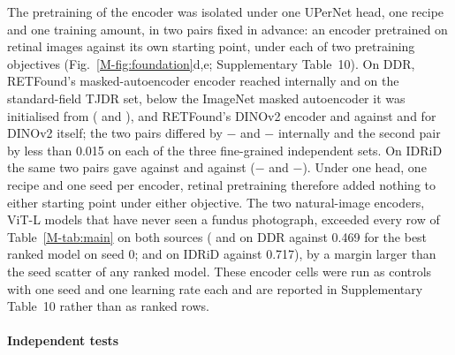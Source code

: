 The pretraining of the encoder was isolated under one UPerNet head, one recipe and one training amount, in two pairs fixed in advance: an encoder pretrained on retinal images against its own starting point, under each of two pretraining objectives (Fig.~\ref{M-fig:foundation}d,e; Supplementary Table~10). On DDR, RETFound's masked-autoencoder encoder reached  internally and  on the standard-field TJDR set, below the ImageNet masked autoencoder it was initialised from ( and ), and RETFound's DINOv2 encoder  and  against  and  for DINOv2 itself; the two pairs differed by $-$ and $-$ internally and the second pair by less than 0.015 on each of the three fine-grained independent sets. On IDRiD the same two pairs gave  against  and  against  ($-$ and $-$). Under one head, one recipe and one seed per encoder, retinal pretraining therefore added nothing to either starting point under either objective. The two natural-image encoders, ViT-L models that have never seen a fundus photograph, exceeded every row of Table~\ref{M-tab:main} on both sources ( and  on DDR against 0.469 for the best ranked model on seed 0;  and  on IDRiD against 0.717), by a margin larger than the seed scatter of any ranked model. These encoder cells were run as controls with one seed and one learning rate each and are reported in Supplementary Table~10 rather than as ranked rows.

\paragraph{Independent tests}

